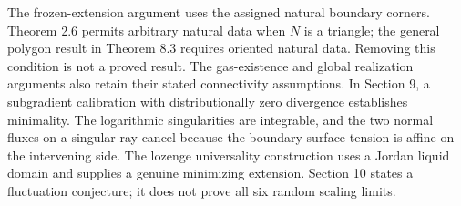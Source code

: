 \documentclass[10pt]{article}
\begin{document}
The frozen-extension argument uses the assigned natural boundary corners. Theorem 2.6 permits arbitrary natural data when \(N\) is a triangle; the general polygon result in Theorem 8.3 requires oriented natural data. Removing this condition is not a proved result. The gas-existence and global realization arguments also retain their stated connectivity assumptions. In Section 9, a subgradient calibration with distributionally zero divergence establishes minimality. The logarithmic singularities are integrable, and the two normal fluxes on a singular ray cancel because the boundary surface tension is affine on the intervening side. The lozenge universality construction uses a Jordan liquid domain and supplies a genuine minimizing extension. Section 10 states a fluctuation conjecture; it does not prove all six random scaling limits.\par
\end{document}
